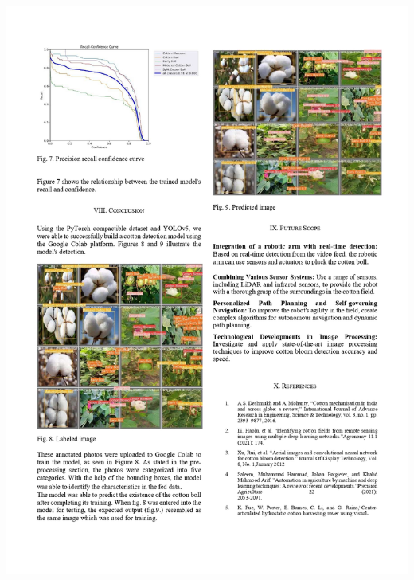 \documentclass[12pt,a4paper]{report}
\begin{document}
\includegraphics[scale=0.7]{images/copyright/publication/Publication/Publication_page-0006.jpg}
\newpage
\end{document}
